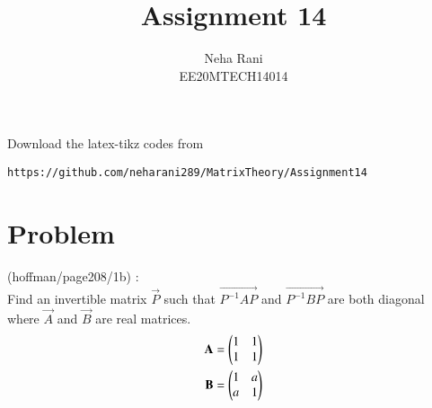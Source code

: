 \documentclass[journal,12pt]{IEEEtran}
\begin{document}
     \def\rightbox#1{\makebox[0in][r]{#1}}
     \def\centbox#1{\makebox[0in]{#1}}
     \def\topbox#1{\raisebox{-\baselineskip}[0in][0in]{#1}}
     \def\midbox#1{\raisebox{-0.5\baselineskip}[0in][0in]{#1}}
\vspace{3cm}
\title{Assignment 14}
\author{Neha Rani\\EE20MTECH14014}
\maketitle
\renewcommand{\thefigure}{\theenumi}
\renewcommand{\thetable}{\theenumi}
%
Download the latex-tikz codes from 
%
\begin{lstlisting}
https://github.com/neharani289/MatrixTheory/Assignment14
\end{lstlisting}
\section{\textbf{Problem}}
(hoffman/page208/1b) : \\
%
%
Find an invertible matrix $\vec{P}$ such that $\vec{P^{-1}AP}$ and $\vec{P^{-1}BP}$ are both diagonal where $\vec{A}$ and $\vec{B}$ are real matrices.
\begin{align}
    \Vec{A}=\myvec{1&1\\1&1}\\ 
    \vec{B}=\myvec{1&a\\a&1}
\end{align}
\end{document}
